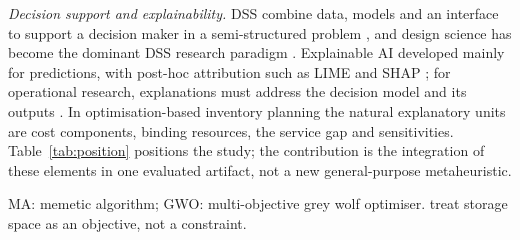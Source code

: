 \documentclass[preprint,12pt,authoryear]{elsarticle}
\begin{document}
\emph{Decision support and explainability.} DSS combine data, models and an interface to support a decision maker in a semi-structured problem \citep{Shim2002,Power2002}, and design science has become the dominant DSS research paradigm \citep{Arnott2014}. Explainable AI developed mainly for predictions, with post-hoc attribution such as LIME and SHAP \citep{Ribeiro2016,Lundberg2017,Arrieta2020}; for operational research, explanations must address the decision model and its outputs \citep{DeBock2024,Coussement2024}. In optimisation-based inventory planning the natural explanatory units are cost components, binding resources, the service gap and sensitivities. Table~\ref{tab:position} positions the study; the contribution is the integration of these elements in one evaluated artifact, not a new general-purpose metaheuristic.

\begin{table}[!t]
\centering\footnotesize
\caption{Capabilities of the closest works and of this study (\checkmark: stated in the source; --: not stated).}\label{tab:position}
\par\smallskip\parbox{0.95\linewidth}{\scriptsize MA: memetic algorithm; GWO: multi-objective grey wolf optimiser. \citet{Tan2024} treat storage space as an objective, not a constraint.}
\end{table}
\end{document}
